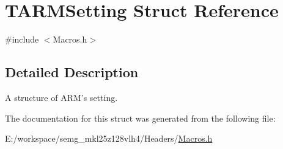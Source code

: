 \hypertarget{struct_t_a_r_m_setting}{\section{T\-A\-R\-M\-Setting Struct Reference}
\label{struct_t_a_r_m_setting}
}


{\ttfamily \#include $<$Macros.\-h$>$}



\subsection{Detailed Description}
A structure of A\-R\-M's setting. 

The documentation for this struct was generated from the following file\-:\begin{DoxyCompactItemize}
\item 
E\-:/workspace/semg\-\_\-mkl25z128vlh4/\-Headers/\hyperlink{_macros_8h}{Macros.\-h}\end{DoxyCompactItemize}
